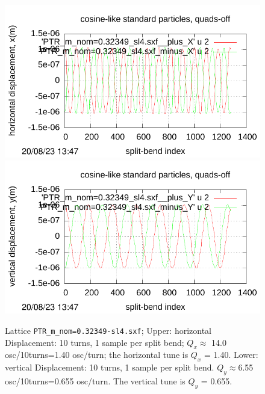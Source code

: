 \documentclass[12pt]{article}
\begin{document}
\begin{figure}[htbp]
  \includegraphics[scale=0.65]{pdf/Fig-p32-t.pdf}
  \includegraphics[scale=0.65]{pdf/Fig-p32-b.pdf} 
\caption{Lattice {\tt PTR\_m\_nom=0.32349-sl4.sxf}; Upper: horizontal Displacement: 10 turns, 
1 sample per split bend; $Q_x\approx$ 14.0 osc/10turns=1.40 osc/turn; the horizontal tune is $Q_x$ = 1.40. 
Lower: vertical Displacement: 10 turns, 1 sample per split bend. $Q_y\approx$6.55 osc/10turns=0.655 osc/turn. 
The vertical tune is $Q_y$ = 0.655.}
\end{figure}
%
%
\end{document}
